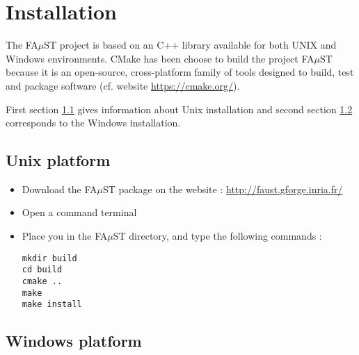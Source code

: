 
\chapter{Installation}\label{sec:install}

The FA$\mu$ST project is based on an C++ library available for both UNIX and Windows environments. CMake has been choose to build the project FA$\mu$ST because it is an open-source, cross-platform family of tools designed to build, test and package software (cf. website \url{https://cmake.org/}).

First section \ref{sec:UnixInstall} gives information about Unix installation and second section \ref{sec:WinInstall} corresponds to the Windows installation. 

\section{Unix platform}\label{sec:UnixInstall}

\begin{itemize}
\item Download the FA$\mu$ST package on the website :  \url{http://faust.gforge.inria.fr/}
\item Open a command terminal
\item Place you in the FA$\mu$ST directory, and type the following commands : 
\begin{lstlisting}
mkdir build
cd build
cmake ..
make
make install
\end{lstlisting}
\end{itemize}


\section{Windows platform}\label{sec:WinInstall}

